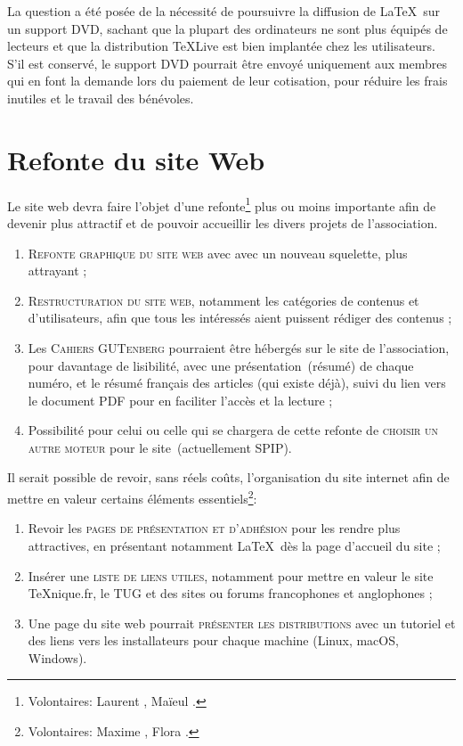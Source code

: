 \documentclass{tufte-handout}
\newcommand{\ratio}[3][]{\marginpar{\footnotesize{\textcolor{teal}{Temps requis: #2 / Utilité: #3}\par\noindent \textcolor{teal}{#1}}}}
\begin{document}
{La question a été posée\ratio[Relativement chronophage et coûteux]{++}{+} de la nécessité de poursuivre la diffusion de \LaTeX\ sur un support DVD, sachant que la plupart des ordinateurs ne sont plus équipés de lecteurs et que la distribution \TeX Live est bien implantée chez les utilisateurs. S'il est conservé, le support DVD pourrait être envoyé uniquement aux membres qui en font la demande lors du paiement de leur cotisation, pour réduire les frais inutiles et le travail des bénévoles.


\section{Refonte du site Web}

Le site web devra faire l'objet d'une refonte\ratio[Travail intense, mais limité dans le temps.]{+++}{+++}\footnote{Volontaires: Laurent , Maïeul .} plus ou moins importante afin de devenir plus attractif et de pouvoir accueillir les divers projets de l'association.

\begin{enumerate}
	\item\textsc{Refonte graphique du site web} avec avec un nouveau squelette, plus attrayant ;
	\item\textsc{Restructuration du site web}, notamment les catégories de contenus et d'utilisateurs, afin que tous les intéressés aient puissent rédiger des contenus ;
	\item Les \textsc{Cahiers GUTenberg} pourraient être hébergés sur le site de l'association, pour davantage de lisibilité, avec une présentation~(résumé) de chaque numéro, et le résumé français des articles (qui existe déjà), suivi du lien vers le document PDF pour en faciliter l'accès et la lecture ;
	\item Possibilité pour celui ou celle qui se chargera de cette refonte de \textsc{choisir un autre moteur} pour le site~(actuellement SPIP).
\end{enumerate}

Il serait possible de revoir, sans réels coûts\ratio[Travail limité dans le temps]{+}{+++}, l'organisation du site internet afin de mettre en valeur certains éléments essentiels\footnote{Volontaires: Maxime , Flora .}:

\begin{enumerate}
	\item Revoir les \textsc{pages de présentation et d'adhésion} pour les rendre plus attractives, en présentant notamment \LaTeX\ dès la page d'accueil du site ;
	\item Insérer une \textsc{liste de liens utiles}, notamment pour mettre en valeur le site \TeX nique.fr, le TUG et des sites ou forums francophones et anglophones ;
	\item Une page du site web pourrait \textsc{présenter les distributions} avec un tutoriel et des liens vers les installateurs pour chaque machine (Linux, macOS, Windows).
\end{enumerate}

}
\end{document}
